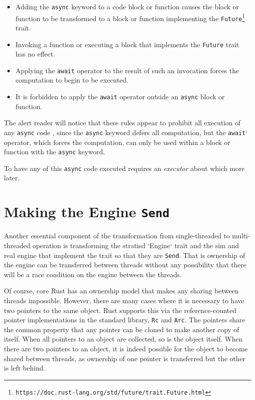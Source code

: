 \documentclass[]{article}
\begin{document}
\begin{itemize}
\item Adding the \texttt{async} keyword to a code block or function causes the block or function to be transformed to a block or function implementing the \texttt{Future}\footnote{\texttt{https://doc.rust-lang.org/std/future/trait.Future.html}} trait.

\item Invoking a function or executing a block that implements the \texttt{Future} trait has no effect.

\item Applying the \texttt{await} operator to the result of such an invocation forces the computation to begin to be executed.

\item It is forbidden to apply the \texttt{await} operator outside an \texttt{async} block or function.
\end{itemize}

The alert reader will notice that these rules appear to prohibit all execution of any \texttt{async} code , since the \texttt{async} keyword defers all computation, but the \texttt{await}` operator, which forces the computation, can only be used within a block or function with the \texttt{async} keyword.

To have any of this \texttt{async} code executed requires an \emph{executor} about which more later.

\section{Making the Engine \texttt{Send}}
Another essential component of the transformation from single-threaded to multi-threaded operation is transforming the stratisd `Engine` trait and the sim and real engine that implement the trait so that they are \texttt{Send}. That is
ownership of the engine can be transferred between threads without any possibility that there will be a race condition on the engine between the threads.

Of course, core Rust has an ownership model that makes any sharing between threads impossible. However, there are many cases where it is necessary to have two pointers to the same object. Rust supports this via the reference-counted pointer implementations in the standard library, \texttt{Rc} and \texttt{Arc}. The pointers share the common property that any pointer can be cloned to make another copy of itself. When all pointers to an object are collected, so is the object itself. When there are two pointers to an object, it is indeed possible for the object to become shared between threads, as ownership of one pointer is transferred but the other is left behind.
\end{document}
